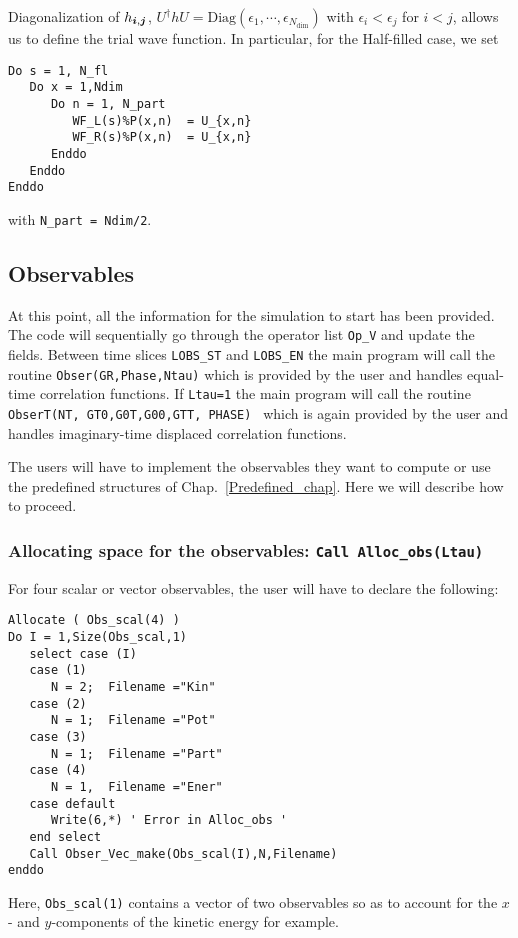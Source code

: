 Diagonalization  of  $ h_{\boldsymbol{i},\boldsymbol{j}}$,      $U^{\dagger} h  U  = \mathrm{Diag} \left(   \epsilon_1, \cdots, \epsilon_{N_{\mathrm{dim}}} \right) $     with  $\epsilon_i  <  \epsilon_j $  for $i < j$, allows us  to define the  trial wave function.  In particular, for the Half-filled case, we set 
\begin{lstlisting}[style=fortran]
Do s = 1, N_fl
   Do x = 1,Ndim
      Do n = 1, N_part
         WF_L(s)%P(x,n)  = U_{x,n}
         WF_R(s)%P(x,n)  = U_{x,n}
      Enddo
   Enddo
Enddo
\end{lstlisting}
with \texttt{N\_part = Ndim/2}.

\subsection{Observables}

At this point, all the information   for the simulation to  start has been provided.  The code will sequentially go through  the operator list  \texttt{Op\_V}  and update the  fields.   Between  time slices   \texttt{LOBS\_ST}  and  \texttt{LOBS\_EN}   the main program will call the routine  \texttt{Obser(GR,Phase,Ntau)}   which is provided by the user and handles equal-time correlation functions. 
If \texttt{Ltau=1} the main program will call the routine \texttt{ObserT(NT,  GT0,G0T,G00,GTT, PHASE) }   which is again  provided by the user and handles  imaginary-time displaced correlation functions. 

The users will have to  implement the  observables  they   want  to compute or use the predefined structures of Chap.~\ref{Predefined_chap}. Here  we  will describe how to  proceed. 

\subsubsection{Allocating space for the observables: \texttt{Call Alloc\_obs(Ltau) }} \label{Alloc_obs_sec}

For  four scalar  or vector observables,  the user will have to  declare the following: 
\begin{lstlisting}[style=fortran]
Allocate ( Obs_scal(4) )
Do I = 1,Size(Obs_scal,1)
   select case (I)
   case (1)
      N = 2;  Filename ="Kin"
   case (2)
      N = 1;  Filename ="Pot"
   case (3)
      N = 1;  Filename ="Part"
   case (4)
      N = 1,  Filename ="Ener"
   case default
      Write(6,*) ' Error in Alloc_obs '  
   end select
   Call Obser_Vec_make(Obs_scal(I),N,Filename)
enddo
\end{lstlisting}
Here,   \texttt{Obs\_scal(1)}   contains a vector  of two observables  so as to account for the $x$- and $y$-components of the kinetic energy for example.  

